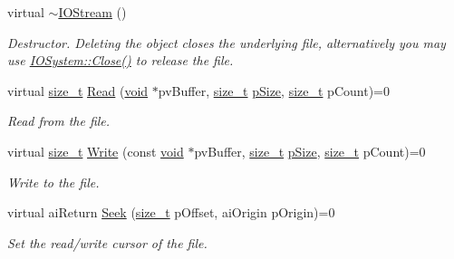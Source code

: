 \begin{DoxyCompactItemize}
\item 
virtual \hyperlink{class_assimp_1_1_i_o_stream_a6cedc5033bf531bf14b97d1c9b788de8}{$\sim$\-I\-O\-Stream} ()
\begin{DoxyCompactList}\small\item\em Destructor. Deleting the object closes the underlying file, alternatively you may use \hyperlink{class_assimp_1_1_i_o_system_a8c334d60f04bceeb6bd0157d21723f3e}{I\-O\-System\-::\-Close()} to release the file. \end{DoxyCompactList}\item 
virtual \hyperlink{_s_d_l__config_8h_a7c94ea6f8948649f8d181ae55911eeaf}{size\-\_\-t} \hyperlink{class_assimp_1_1_i_o_stream_ae376f641020989d61863b9c6f55c7abf}{Read} (\hyperlink{_s_d_l__opengl_8h_a3db05964a3cc4410f35b7ea2b7eb850d}{void} $\ast$pv\-Buffer, \hyperlink{_s_d_l__config_8h_a7c94ea6f8948649f8d181ae55911eeaf}{size\-\_\-t} \hyperlink{_g_l_e_w_2wglew_8h_a95e478a19268863e38a9733ac885ac14}{p\-Size}, \hyperlink{_s_d_l__config_8h_a7c94ea6f8948649f8d181ae55911eeaf}{size\-\_\-t} p\-Count)=0
\begin{DoxyCompactList}\small\item\em Read from the file. \end{DoxyCompactList}\item 
virtual \hyperlink{_s_d_l__config_8h_a7c94ea6f8948649f8d181ae55911eeaf}{size\-\_\-t} \hyperlink{class_assimp_1_1_i_o_stream_ad0ca4aae1b8c4d00db391ac3a4171f7b}{Write} (const \hyperlink{_s_d_l__opengl_8h_a3db05964a3cc4410f35b7ea2b7eb850d}{void} $\ast$pv\-Buffer, \hyperlink{_s_d_l__config_8h_a7c94ea6f8948649f8d181ae55911eeaf}{size\-\_\-t} \hyperlink{_g_l_e_w_2wglew_8h_a95e478a19268863e38a9733ac885ac14}{p\-Size}, \hyperlink{_s_d_l__config_8h_a7c94ea6f8948649f8d181ae55911eeaf}{size\-\_\-t} p\-Count)=0
\begin{DoxyCompactList}\small\item\em Write to the file. \end{DoxyCompactList}\item 
virtual ai\-Return \hyperlink{class_assimp_1_1_i_o_stream_a5ed0dddf418ab08cf3fc21f3f3032220}{Seek} (\hyperlink{_s_d_l__config_8h_a7c94ea6f8948649f8d181ae55911eeaf}{size\-\_\-t} p\-Offset, ai\-Origin p\-Origin)=0
\begin{DoxyCompactList}\small\item\em Set the read/write cursor of the file. \end{DoxyCompactList}\item 

\end{DoxyCompactItemize}
